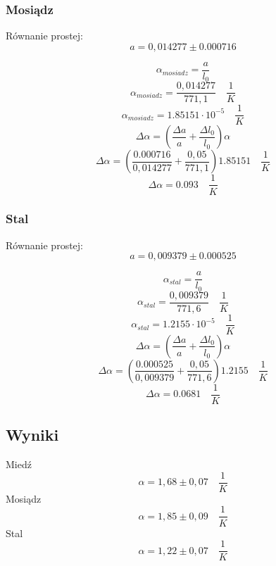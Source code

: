 \documentclass[a4paper, 11pt]{article}
\begin{document}
\subsubsection{Mosiądz}\label{sub:mosiadz} %
Równanie prostej:
\[
	a = 0,014277 \pm 0.000716
\]
\begin{multicols}{2}
	\[
		\alpha_{mosiadz} = \frac{a}{l_0}
	\]
	\[
		\alpha_{mosiadz} = \frac{0,014277}{771,1} \quad \frac{1}{K}
	\]
	\[
		\alpha_{mosiadz} = 1.85151 \cdot 10^{-5} \quad \frac{1}{K}
	\]
	\columnbreak
	\[
		\Delta \alpha = \left( \frac{\Delta a}{a} + \frac{\Delta l_0}{l_0} \right) \alpha
	\]
	\[
		\Delta \alpha = \left( \frac{0.000716}{0,014277} + \frac{0,05}{771,1} \right) 1.85151 \quad \frac{1}{K}
	\]
	\[
		\Delta \alpha = 0.093 \quad \frac{1}{K}
	\]
\end{multicols}

\subsubsection{Stal}\label{sub:stal} %
Równanie prostej:
\[
	a = 0,009379 \pm  0.000525
\]
\begin{multicols}{2}
	\[
		\alpha_{stal} = \frac{a}{l_0}
	\]
	\[
		\alpha_{stal} = \frac{0,009379}{771,6} \quad \frac{1}{K}
	\]
	\[
		\alpha_{stal} = 1.2155 \cdot 10^{-5} \quad \frac{1}{K}
	\]
	\columnbreak
	\[
		\Delta \alpha = \left( \frac{\Delta a}{a} + \frac{\Delta l_0}{l_0} \right) \alpha
	\]
	\[
		\Delta \alpha = \left( \frac{0.000525}{0,009379} + \frac{0,05}{771,6} \right) 1.2155 \quad \frac{1}{K}
	\]
	\[
		\Delta \alpha = 0.0681 \quad \frac{1}{K}
	\]
\end{multicols}

\pagebreak
\subsection{Wyniki}\label{sub:wyniki} %

\begin{center}
	\Large
	Miedź
	\[
		\alpha = 1,68 \pm 0,07 \quad \frac{1}{K}
	\]
	Mosiądz
	\[
		\alpha = 1,85 \pm 0,09 \quad \frac{1}{K}
	\]
	Stal
	\[
		\alpha = 1,22 \pm 0,07\quad \frac{1}{K}
	\]
\end{center}

\end{document}
